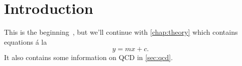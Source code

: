 \chapter{Introduction}
\label{chap:introduction}

This is the beginning~\cite{PDG2014}, but we'll continue with 
\cref{chap:theory} which contains equations \'a la
\begin{equation}
  y = mx + c.
  \label{eqn:foo}
\end{equation}
It also contains some information on \ac{QCD} in \cref{sec:qcd}.

\lipsum[1-12]
